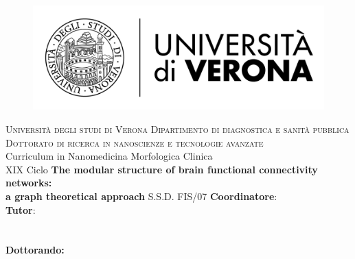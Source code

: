 
\begin{titlepage}
    \begin{figure}[!h]
    \flushleft
	\includegraphics[width=0.25\columnwidth]{images/univr.png}
	\end{figure}

    \begin{center}
    	\large
        \textsc{\large{Università degli studi di Verona}}
        \hfill
        \vfill
		\textsc{\large{Dipartimento di diagnostica e sanità pubblica}}
		\vfill
        \textsc{Dottorato di ricerca in nanoscienze e tecnologie avanzate}\\
        Curriculum in Nanomedicina Morfologica Clinica\\
		XIX Ciclo
		\vfill
        \begingroup
       		\huge\textbf{
            The modular structure of brain functional connectivity networks:\\a graph theoretical approach
            }
            \bigskip
        \endgroup
        \vfill
        S.S.D. FIS/07
		\flushleft 
		\normalsize{\textbf{Coordinatore}:}\\
		\flushleft
		\normalsize{\textbf{Tutor}:}\\
		\\
		\\
        \flushright
        \normalsize{\textbf{Dottorando:}}\\
        \\	
		
        \vfill

        \vfill

    \end{center}  
\end{titlepage}

